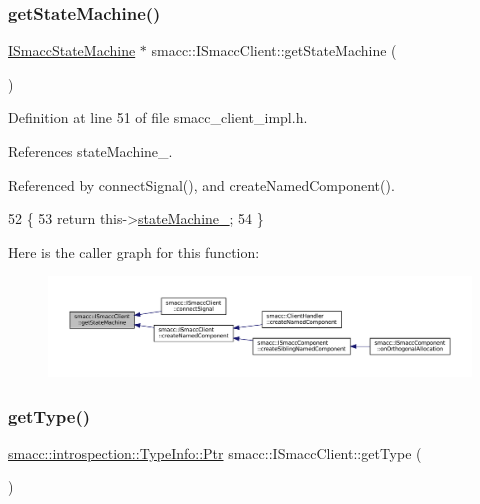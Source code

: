 \subsubsection{\texorpdfstring{get\+State\+Machine()}{getStateMachine()}}
{\footnotesize\ttfamily \hyperlink{classsmacc_1_1ISmaccStateMachine}{I\+Smacc\+State\+Machine} $\ast$ smacc\+::\+I\+Smacc\+Client\+::get\+State\+Machine (\begin{DoxyParamCaption}{ }\end{DoxyParamCaption})\hspace{0.3cm}{\ttfamily [inline]}}



Definition at line 51 of file smacc\+\_\+client\+\_\+impl.\+h.



References state\+Machine\+\_\+.



Referenced by connect\+Signal(), and create\+Named\+Component().


\begin{DoxyCode}
52     \{
53         \textcolor{keywordflow}{return} this->\hyperlink{classsmacc_1_1ISmaccClient_a926e4f2ae796def63d48dca389a48c47}{stateMachine\_};
54     \}
\end{DoxyCode}
Here is the caller graph for this function\+:
\nopagebreak
\begin{figure}[H]
\begin{center}
\leavevmode
\includegraphics[width=350pt]{classsmacc_1_1ISmaccClient_aec51d4712404cb9882b86e4c854bb93a_icgraph}
\end{center}
\end{figure}
\mbox{\label{classsmacc_1_1ISmaccClient_ae7faf4e40510c73810e6b0ef9fec8f33}} 
\subsubsection{\texorpdfstring{get\+Type()}{getType()}}
{\footnotesize\ttfamily \hyperlink{classsmacc_1_1introspection_1_1TypeInfo_aa6ffd9c39811d59f7c771941b7fad860}{smacc\+::introspection\+::\+Type\+Info\+::\+Ptr} smacc\+::\+I\+Smacc\+Client\+::get\+Type (\begin{DoxyParamCaption}{ }\end{DoxyParamCaption})\hspace{0.3cm}{\ttfamily [virtual]}}



